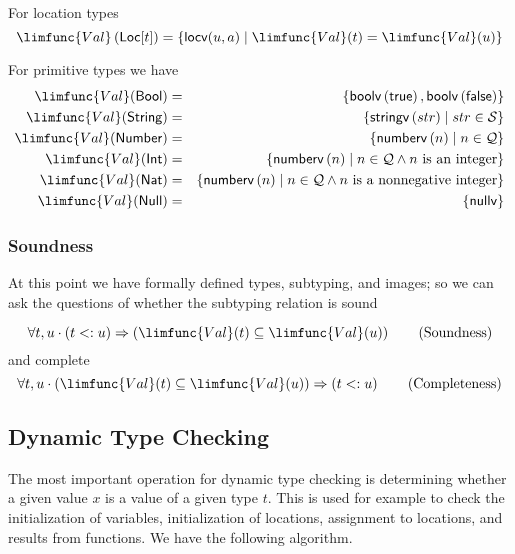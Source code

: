 \documentclass[12pt]{article}
\begin{document}
For location types%
\begin{equation*}
\limfunc{Val}\left( \mathsf{Loc}[t]\right) =\left\{ \mathsf{locv}(u,a)\mid 
\limfunc{Val}(t)=\limfunc{Val}(u)\right\}
\end{equation*}

For primitive types we have%
\begin{eqnarray*}
\limfunc{Val}(\mathsf{Bool}) &=&\left\{ \mathsf{boolv}\left( \mathsf{true}%
\right) ,\mathsf{boolv}\left( \mathsf{false}\right) \right\} \\
\limfunc{Val}(\mathsf{String}) &=&\left\{ \mathsf{stringv}\left( str\right)
\mid str\in \mathcal{S}\right\} \\
\limfunc{Val}(\mathsf{Number}) &=&\left\{ \mathsf{numberv}\left( n\right)
\mid n\in \mathcal{Q}\right\} \\
\limfunc{Val}(\mathsf{Int}) &=&\left\{ \mathsf{numberv}\left( n\right) \mid
n\in \mathcal{Q}\wedge n\text{ is an integer}\right\} \\
\limfunc{Val}(\mathsf{Nat}) &=&\left\{ \mathsf{numberv}\left( n\right) \mid
n\in \mathcal{Q}\wedge n\text{ is a nonnegative integer}\right\} \\
\limfunc{Val}(\mathsf{Null}) &=&\left\{ \mathsf{nullv}\right\}
\end{eqnarray*}

\subsubsection{Soundness}

At this point we have formally defined types, subtyping, and images; so we
can ask the questions of whether the subtyping relation is sound

\begin{equation}
\forall t,u\cdot \left( t<:u\right) \Rightarrow \left( \limfunc{Val}%
(t)\subseteq \limfunc{Val}(u)\right)  \tag{Soundness}
\end{equation}%
and complete%
\begin{equation}
\forall t,u\cdot \left( \limfunc{Val}(t)\subseteq \limfunc{Val}(u)\right)
\Rightarrow \left( t<:u\right)  \tag{Completeness}
\end{equation}

\subsection{Dynamic Type Checking}

The most important operation for dynamic type checking is determining
whether a given value $x$ is a value of a given type $t$. This is used for
example to check the initialization of variables, initialization of
locations, assignment to locations, and results from functions. We have the
following algorithm.
\end{document}
